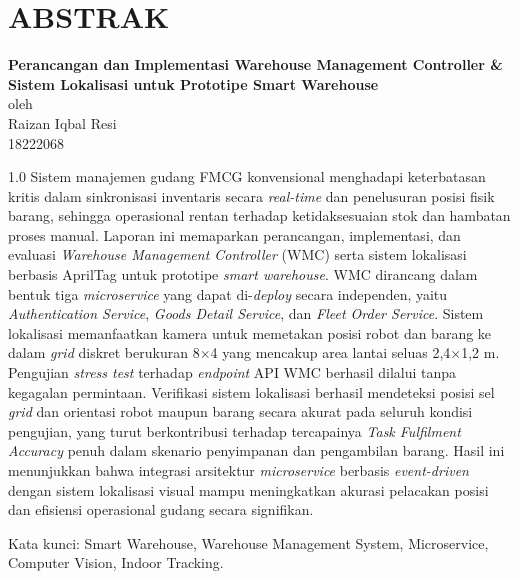 \chapter*{ABSTRAK}

\begin{center}

    \textbf{Perancangan dan Implementasi Warehouse Management Controller \& Sistem Lokalisasi untuk Prototipe Smart Warehouse} \\
    \vspace{0.4cm}
    oleh \\
    \vspace{0.4cm}
    Raizan Iqbal Resi\\
    18222068\\
\end{center}


\begin{spacing}{1.0}
Sistem manajemen gudang FMCG konvensional menghadapi keterbatasan kritis dalam
sinkronisasi inventaris secara \textit{real-time} dan penelusuran posisi fisik
barang, sehingga operasional rentan terhadap ketidaksesuaian stok dan hambatan
proses manual. Laporan ini memaparkan perancangan, implementasi, dan evaluasi
\textit{Warehouse Management Controller} (WMC) serta sistem lokalisasi berbasis
AprilTag untuk prototipe \textit{smart warehouse}. WMC dirancang dalam bentuk
tiga \textit{microservice} yang dapat di-\textit{deploy} secara independen,
yaitu \textit{Authentication Service}, \textit{Goods Detail Service}, dan
\textit{Fleet Order Service}. Sistem lokalisasi memanfaatkan kamera untuk
memetakan posisi robot dan barang ke dalam \textit{grid} diskret berukuran
8×4 yang mencakup area lantai seluas 2,4×1,2 m. Pengujian \textit{stress test}
terhadap \textit{endpoint} API WMC berhasil dilalui tanpa kegagalan permintaan.
Verifikasi sistem lokalisasi berhasil mendeteksi posisi sel \textit{grid} dan
orientasi robot maupun barang secara akurat pada seluruh kondisi pengujian,
yang turut berkontribusi terhadap tercapainya \textit{Task Fulfilment Accuracy}
penuh dalam skenario penyimpanan dan pengambilan barang. Hasil ini menunjukkan
bahwa integrasi arsitektur \textit{microservice} berbasis \textit{event-driven}
dengan sistem lokalisasi visual mampu meningkatkan akurasi pelacakan posisi dan
efisiensi operasional gudang secara signifikan.

Kata kunci: Smart Warehouse, Warehouse Management System, Microservice, Computer Vision, Indoor Tracking.
\end{spacing}

